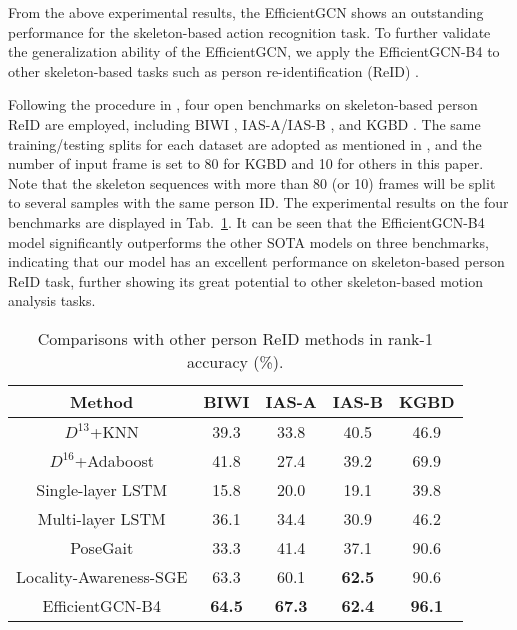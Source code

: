 \documentclass[10pt,journal,compsoc]{IEEEtran}
\begin{document}
From the above experimental results, the EfficientGCN shows an outstanding performance for the skeleton-based action recognition task. To further validate the generalization ability of the EfficientGCN, we apply the EfficientGCN-B4 to other skeleton-based tasks such as person re-identification (ReID) \cite{zhao2017spindle,rao2021self}.

Following the procedure in \cite{rao2021self}, four open benchmarks on skeleton-based person ReID are employed, including BIWI \cite{munaro2014one}, IAS-A/IAS-B \cite{munaro2014feature}, and KGBD \cite{andersson2015person}. The same training/testing splits for each dataset are adopted as mentioned in \cite{rao2021self}, and the number of input frame is set to 80 for KGBD and 10 for others in this paper. Note that the skeleton sequences with more than 80 (or 10) frames will be split to several samples with the same person ID. The experimental results on the four benchmarks are displayed in Tab.~\ref{tab:generalization}. It can be seen that the EfficientGCN-B4 model significantly outperforms the other SOTA models on three benchmarks, indicating that our model has an excellent performance on skeleton-based person ReID task, further showing its great potential to other skeleton-based motion analysis tasks.

\begin{table}[t]
  \caption{Comparisons with other person ReID methods in rank-1 accuracy (\%).}
  \label{tab:generalization}
  \centering
  \setlength{\tabcolsep}{4pt}
  \renewcommand{\arraystretch}{1.2}
  \vspace{-0.2cm}
  \begin{tabular}{c|cccc}
  \toprule
  Method & BIWI & IAS-A & IAS-B & KGBD \\
  \midrule
  $D^{13}$+KNN \cite{munaro2014one} & 39.3 & 33.8 & 40.5 & 46.9 \\
  $D^{16}$+Adaboost \cite{pala2019enhanced} & 41.8 & 27.4 & 39.2 & 69.9 \\
  Single-layer LSTM \cite{haque2016recurrent} & 15.8 & 20.0 & 19.1 & 39.8 \\
  Multi-layer LSTM \cite{zheng2019relational} & 36.1 & 34.4 & 30.9 & 46.2 \\
  PoseGait \cite{liao2020model} & 33.3 & 41.4 & 37.1 & 90.6 \\
  Locality-Awareness-SGE \cite{rao2021self} & 63.3 & 60.1 & {\bf 62.5} & 90.6 \\
  \midrule
  EfficientGCN-B4 & {\bf 64.5} & {\bf 67.3} & {\bf 62.4} & {\bf 96.1} \\
  \bottomrule
  \end{tabular}
\end{table}
\end{document}
